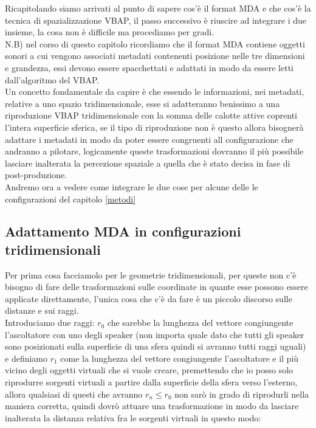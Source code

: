 \documentclass[12pt,a4paper]{report}
\begin{document}
Ricapitolando siamo arrivati al punto di sapere cos'è il format MDA e che cos'è la tecnica di spazializzazione VBAP, 
il passo successivo è riuscire ad integrare i due insieme, la cosa non è difficile ma procediamo per gradi.\\

N.B) nel corso di questo capitolo
ricordiamo che il format MDA contiene oggetti sonori a cui vengono associati metadati contenenti posizione nelle tre dimensioni e grandezza, essi devono essere spacchettati e adattati in modo da essere letti dall'algoritmo del VBAP.\\

Un concetto fondamentale da capire è che essendo le informazioni, nei metadati, relative a uno spazio tridimensionale, esse si adatteranno benissimo a una riproduzione VBAP tridimensionale con la somma delle calotte attive coprenti l'intera superficie sferica, se il tipo di riproduzione non è questo allora bisognerà adattare i metadati in modo da poter essere congruenti all configurazione che andranno a pilotare, logicamente queste trasformazioni dovranno il più possibile lasciare inalterata la percezione spaziale a quella che è stato decisa in fase di post-produzione.\\

Andremo ora a vedere come integrare le due cose per alcune delle le configurazioni del capitolo \ref{metodi}

\subsection{Adattamento MDA in configurazioni tridimensionali}

Per prima cosa facciamolo per le geometrie tridimensionali, per queste non c'è bisogno di fare delle trasformazioni sulle coordinate in quante esse possono essere applicate direttamente, l'unica cosa che c'è da fare è un piccolo discorso sulle distanze e sui raggi.\\

Introduciamo due raggi: $r_0$ che sarebbe la lunghezza del vettore congiungente l'ascoltatore con uno degli speaker (non importa quale dato che tutti gli speaker sono posizionati sulla superficie di una sfera quindi si avranno tutti raggi uguali) e definiamo $r_1$ come la lunghezza del vettore congiungente l'ascoltatore e il più vicino degli oggetti virtuali che si vuole creare, premettendo che io posso solo riprodurre sorgenti virtuali a partire dalla superficie della sfera verso l'esterno, allora qualsiasi di questi che avranno $r_n \leq r_0$ non sarò in grado di riprodurli nella maniera corretta, quindi dovrò attuare una trasformazione in modo da lasciare inalterata la distanza relativa fra le sorgenti virtuali in questo modo:
\end{document}
